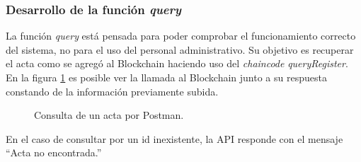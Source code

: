 \subsubsection{Desarrollo de la función \textit{query}}
La función \textit{query} está pensada para poder comprobar el funcionamiento correcto del sistema, no para el uso del personal administrativo. Su objetivo es recuperar el acta como se agregó al Blockchain haciendo uso del \textit{chaincode} \textit{queryRegister}.
En la figura \ref{fig:query_register_api} es posible ver la llamada al Blockchain junto a su respuesta constando de la información previamente subida.
\begin{figure}[H]
    \caption{Consulta de un acta por Postman.}
    \label{fig:query_register_api}
\end{figure}
En el caso de consultar por un id inexistente, la API responde con el mensaje ``Acta no encontrada.''

